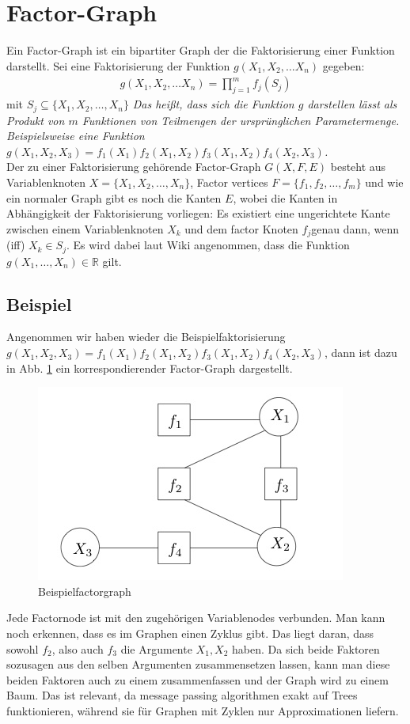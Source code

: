 \documentclass[paper=a4,10pt]{scrartcl}
\begin{document}
\section{Factor-Graph}
Ein Factor-Graph ist ein bipartiter Graph der die Faktorisierung einer Funktion darstellt. Sei eine Faktorisierung der Funktion $g(X_1, X_2, \dots X_n)$ gegeben:
\begin{align}
g(X_1, X_2, \dots X_n) = \prod_{j=1}^m f_j(S_j)
\end{align}
mit $S_j \subseteq \{X_1,X_2, \dots, X_n\}$
\textit{Das heißt, dass sich die Funktion $g$ darstellen lässt als Produkt von $m$ Funktionen von Teilmengen der ursprünglichen Parametermenge. Beispielsweise eine Funktion $g(X_1, X_2, X_3) = f_1(X_1)f_2(X_1, X_2)f_3(X_1, X_2)f_4(X_2, X_3)$.}\\
Der zu einer Faktorisierung gehörende Factor-Graph $G(X,F,E)$ besteht aus Variablenknoten $X=\{X_1, X_2, \dots, X_n\}$, Factor vertices $F=\{f_1, f_2, \dots, f_m\}$ und wie ein normaler Graph gibt es noch die Kanten $E$, wobei die Kanten in Abhängigkeit der Faktorisierung vorliegen: Es existiert eine ungerichtete Kante zwischen einem Variablenknoten $X_k$ und dem factor Knoten $f_j$genau dann, wenn (iff) $X_k \in S_j$. Es wird dabei laut Wiki angenommen, dass die Funktion $g(X_1, \dots, X_n) \in \mathbb{R}$ gilt.

\subsection{Beispiel}
Angenommen wir haben wieder die Beispielfaktorisierung $g(X_1, X_2, X_3) = f_1(X_1)f_2(X_1, X_2)f_3(X_1, X_2)f_4(X_2, X_3)$, dann ist dazu in Abb. \ref{fig:factorgraph} ein korrespondierender Factor-Graph dargestellt. 

\begin{figure}[H]
\centering
\includegraphics[scale=1]{../bilder/Factorgraph.jpg}
\caption{Beispielfactorgraph}
\label{fig:factorgraph}
\end{figure}
Jede Factornode ist mit den zugehörigen Variablenodes verbunden. Man kann noch erkennen, dass es im Graphen einen Zyklus gibt. Das liegt daran, dass sowohl $f_2$, also auch $f_3$ die Argumente $X_1, X_2$ haben. Da sich beide Faktoren sozusagen aus den selben Argumenten zusammensetzen lassen, kann man diese beiden Faktoren auch zu einem zusammenfassen und der Graph wird zu einem Baum. Das ist relevant, da message passing algorithmen exakt auf Trees funktionieren, während sie für Graphen mit Zyklen nur Approximationen liefern. 
\end{document}
